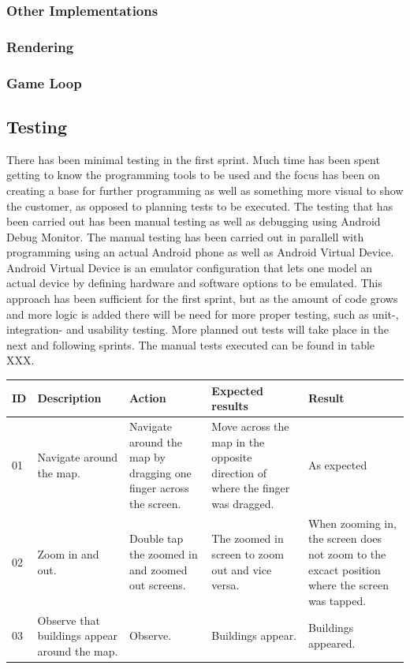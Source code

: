 \subsubsection{Other Implementations}
\subsubsection*{Rendering}
\subsubsection*{Game Loop}

\subsection{Testing}

There has been minimal testing in the first sprint. Much time has been spent getting to know the programming tools to be used and the focus has been on creating a base for further programming as well as something more visual to show the customer, as opposed to planning tests to be executed. The testing that has been carried out has been manual testing as well as debugging using Android Debug Monitor. The manual testing has been carried out in parallell with programming using an actual Android phone as well as Android Virtual Device. Android Virtual Device is an emulator configuration that lets one model an actual device by defining hardware and software options to be emulated. This approach has been sufficient for the first sprint, but as the amount of code grows and more logic is added there will be need for more proper testing, such as unit-, integration- and usability testing. More planned out tests will take place in the next and following sprints. The manual tests executed can be found in table XXX.

\begin{tabular}{| l | p{2.5cm} | p{3cm} | p{3.5cm} | p{2.5cm} |}
	\hline
	\rowcolor{gray}
	{\bf ID} & {\bf Description} & {\bf Action} & {\bf Expected results} & {\bf Result} \\ \hline
	
	01 & Navigate around the map. & Navigate around the map by dragging one finger across the screen. & Move across the map in the opposite direction of where the finger was dragged. & As expected \\ \hline
	
	02 & Zoom in and out. & Double tap the zoomed in and zoomed out screens. & The zoomed in screen to zoom out and vice versa. & When zooming in, the screen does not zoom to the excact position where the screen was tapped. \\ \hline
	
	03 & Observe that buildings appear around the map. & Observe. & Buildings appear. & Buildings appeared. \\ \hline
\end{tabular}

